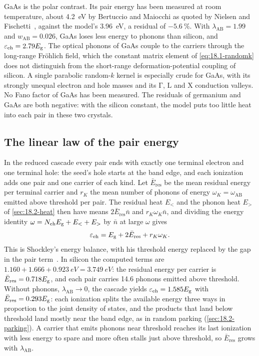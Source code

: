GaAs is the polar contrast. Its pair energy has been measured at room temperature, about \SI{4.2}{eV} by Bertuccio and Maiocchi as quoted by Nielsen and Fischetti~\cite[Fig.~1]{nielsen2026first}, against the model's \SI{3.96}{eV}, a residual of $-\SI{5.6}{\percent}$. With $\lambda_{\mathrm{AB}} = 1.99$ and $w_{\mathrm{AB}} = 0.026$, GaAs loses less energy to phonons than silicon, and $\varepsilon_{\mathrm{eh}} = 2.79E_{\mathrm{g}}$. The optical phonons of GaAs couple to the carriers through the long-range Fr\"ohlich field, which the constant matrix element of \cref{eq:18.1-randomk} does not distinguish from the short-range deformation-potential coupling of silicon. A single parabolic random-$k$ kernel is especially crude for GaAs, with its strongly unequal electron and hole masses and its $\mathrm{\Gamma}$, $\mathrm{L}$ and $\mathrm{X}$ conduction valleys. No Fano factor of GaAs has been measured. The residuals of germanium and GaAs are both negative: with the silicon constant, the model puts too little heat into each pair in these two crystals.

\subsection{The linear law of the pair energy}\label{sec:18.4-linear}

In the reduced cascade every pair ends with exactly one terminal electron and one terminal hole: the seed's hole starts at the band edge, and each ionization adds one pair and one carrier of each kind. Let $\bar E_{\mathrm{res}}$ be the mean residual energy per terminal carrier and $r_K$ the mean number of phonons of energy $\omega_K = \omega_{\mathrm{AB}}$ emitted above threshold per pair. The residual heat $E_<$ and the phonon heat $E_>$ of \cref{sec:18.2-heat} then have means $2\bar E_{\mathrm{res}}\bar n$ and $r_K\omega_K\bar n$, and dividing the energy identity $\omega = N_{\mathrm{eh}}E_{\mathrm{g}} + E_< + E_>$ by $\bar n$ at large $\omega$ gives
\begin{equation}
  \varepsilon_{\mathrm{eh}} = E_{\mathrm{g}} + 2\bar E_{\mathrm{res}} + r_K\omega_K .
  \label{eq:18.4-shockley}
\end{equation}
This is Shockley's energy balance, with his threshold energy replaced by the gap in the pair term~\cite[Eq.~(1)]{nielsen2026first}. In silicon the computed terms are $1.160 + 1.666 + \SI{0.923}{eV} = \SI{3.749}{eV}$: the residual energy per carrier is $\bar E_{\mathrm{res}} = 0.718E_{\mathrm{g}}$, and each pair carries 14.6 phonons emitted above threshold. Without phonons, $\lambda_{\mathrm{AB}} \to 0$, the cascade yields $\varepsilon_{\mathrm{eh}} = 1.585E_{\mathrm{g}}$ with $\bar E_{\mathrm{res}} = 0.293E_{\mathrm{g}}$: each ionization splits the available energy three ways in proportion to the joint density of states, and the products that land below threshold land mostly near the band edge, as in random parking (\cref{sec:18.2-parking}). A carrier that emits phonons near threshold reaches its last ionization with less energy to spare and more often stalls just above threshold, so $\bar E_{\mathrm{res}}$ grows with $\lambda_{\mathrm{AB}}$.

